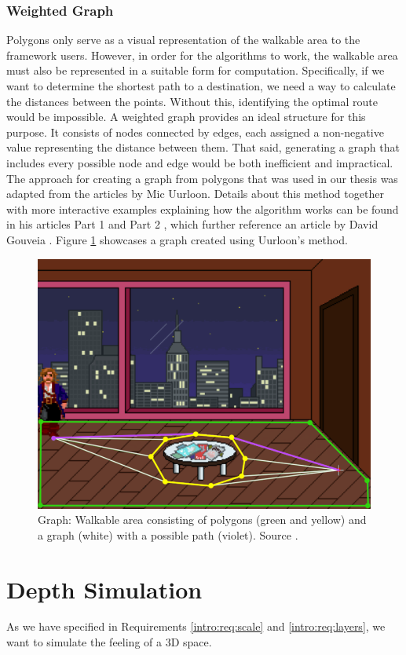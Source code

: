 \subsubsection{Weighted Graph}
\label{Analysis:Graph}
Polygons only serve as a visual representation of the walkable area to the framework users. However, in order for the algorithms to work, the walkable area must also be represented in a suitable form for computation. Specifically, if we want to determine the shortest path to a destination, we need a way to calculate the distances between the points. Without this, identifying the optimal route would be impossible. A weighted graph provides an ideal structure for this purpose. It consists of nodes connected by edges, each assigned a non-negative value representing the distance between them. That said, generating a graph that includes every possible node and edge would be both inefficient and impractical. The approach for creating a graph from polygons that was used in our thesis was adapted from the articles by Mic Uurloon. Details about this method together with more interactive examples explaining how the algorithm works can be found in his articles Part 1 \cite{Uurloon1} and Part 2 \cite{Uurloon2}, which further reference an article by David Gouveia \cite{Gouveia}.
Figure \ref{fig:Graph}
showcases a graph created using Uurloon's method.
\begin{figure}[H]
\centering
\includegraphics[width=.7\linewidth]{img/WS-polygons3.png}
\caption{Graph: Walkable area consisting of polygons (green and yellow) and a graph (white) with a possible path (violet). Source \cite{Uurloon1}.}
\label{fig:Graph}
\end{figure}


\section{Depth Simulation}
As we have specified in Requirements \ref{intro:req:scale} and \ref{intro:req:layers}, we want to simulate the feeling of a 3D space. 

